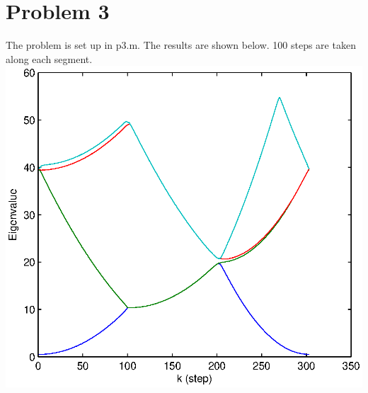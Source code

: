 \documentclass[a4paper,11pt]{article}
\numberwithin{equation}{section}
\begin{document}
\section{Problem 3}
The problem is set up in p3.m. The results are shown below.
100 steps are taken along each segment.\\
\includegraphics{p3}
\end{document}
